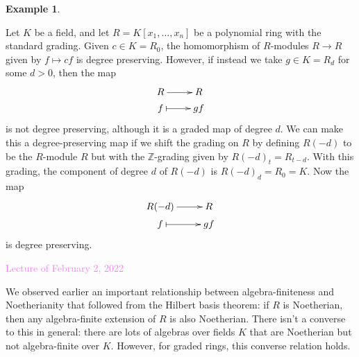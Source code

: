 \documentclass{amsart}[12pt]
\newcommand{\Feb}[1]{\textcolor{violet}{Lecture of February #1, 2022}}
\newcommand{\ZZ}{\mathbb{Z}}
\numberwithin{equation}{section}
\theoremstyle{plain} %
\theoremstyle{definition}
\newtheorem{example}[equation]{Example}
\theoremstyle{remark}
\begin{document}
\begin{example}\label{example shift}


Let $K$ be a field, and let $R=K[x_1,\dots,x_n]$ be a polynomial ring with the standard grading. Given $c\in K=R_0$, the homomorphism of $R$-modules $R\to R$ given by $f\mapsto cf$ is degree preserving. However, if instead we take $g\in K=R_d$ for some $d>0$, then the map 
\[\xymatrix@R=1mm{R \ar[r] & R \\
f \ar@{|->}[r] & gf}\]
is not degree preserving, although it is a graded map of degree $d$. We can make this a degree-preserving map if we shift the grading on $R$ by defining $R(-d)$ to be the $R$-module $R$ but with the $\ZZ$-grading given by $R(-d)_t=R_{t-d}$. With this grading, the component of degree $d$ of $R(-d)$ is $R(-d)_d=R_0=K$. Now the map 
\[\xymatrix@R=1mm{R(-d) \ar[r] & R \\
f \ar@{|->}[r] & gf}\]
is degree preserving.
\end{example}

\Feb{2}


We observed earlier an important relationship between algebra-finiteness and Noetherianity that followed from the Hilbert basis theorem: if $R$ is Noetherian, then any algebra-finite extension of $R$ is also Noetherian. There isn't a converse to this in general: there are lots of algebras over fields $K$ that are Noetherian but not algebra-finite over $K$. However, for graded rings, this converse relation holds.
\end{document}
